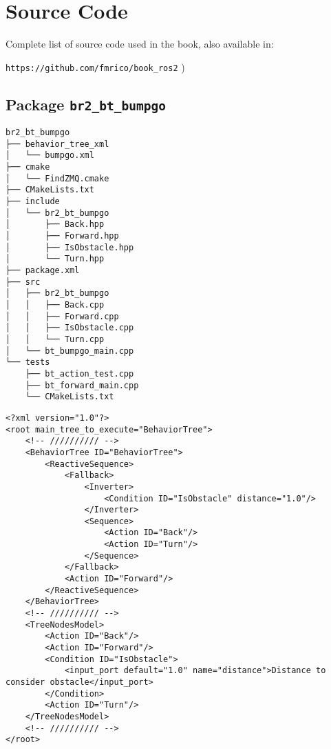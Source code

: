 \appendix

\chapter[Source Code]{Source Code}
\label{cap:source}
Complete list of source code used in the book, also available in:

\vspace{0.5cm}
\large
\texttt{https://github.com/fmrico/book\_ros2}
\normalsize
)
\section{Package \texttt{br2\_bt\_bumpgo}}
\label{sec:anex:br2_bt_bumpgo}

 \footnotesize
\begin{tcolorbox}[sharp corners, colframe=gray!80, colback=LightGray, left=0pt, top=0pt, bottom=0pt, title=Package \texttt{br2\_bt\_bumpgo}]
  \begin{verbatim}
br2_bt_bumpgo
├── behavior_tree_xml
│   └── bumpgo.xml
├── cmake
│   └── FindZMQ.cmake
├── CMakeLists.txt
├── include
│   └── br2_bt_bumpgo
│       ├── Back.hpp
│       ├── Forward.hpp
│       ├── IsObstacle.hpp
│       └── Turn.hpp
├── package.xml
├── src
│   ├── br2_bt_bumpgo
│   │   ├── Back.cpp
│   │   ├── Forward.cpp
│   │   ├── IsObstacle.cpp
│   │   └── Turn.cpp
│   └── bt_bumpgo_main.cpp
└── tests
    ├── bt_action_test.cpp
    ├── bt_forward_main.cpp
    └── CMakeLists.txt    \end{verbatim}
    \end{tcolorbox}
  \normalsize

 \footnotesize
\begin{tcolorbox}[sharp corners, colframe=gray!80, colback=LightGray, left=0pt, top=0pt, bottom=0pt, title=\texttt{br2\_bt\_bumpgo/behavior\_tree\_xml/bumpgo.xml}]
  \begin{verbatim}
<?xml version="1.0"?>
<root main_tree_to_execute="BehaviorTree">
    <!-- ////////// -->
    <BehaviorTree ID="BehaviorTree">
        <ReactiveSequence>
            <Fallback>
                <Inverter>
                    <Condition ID="IsObstacle" distance="1.0"/>
                </Inverter>
                <Sequence>
                    <Action ID="Back"/>
                    <Action ID="Turn"/>
                </Sequence>
            </Fallback>
            <Action ID="Forward"/>
        </ReactiveSequence>
    </BehaviorTree>
    <!-- ////////// -->
    <TreeNodesModel>
        <Action ID="Back"/>
        <Action ID="Forward"/>
        <Condition ID="IsObstacle">
            <input_port default="1.0" name="distance">Distance to consider obstacle</input_port>
        </Condition>
        <Action ID="Turn"/>
    </TreeNodesModel>
    <!-- ////////// -->
</root>

    \end{verbatim}
    \end{tcolorbox}
  \normalsize

